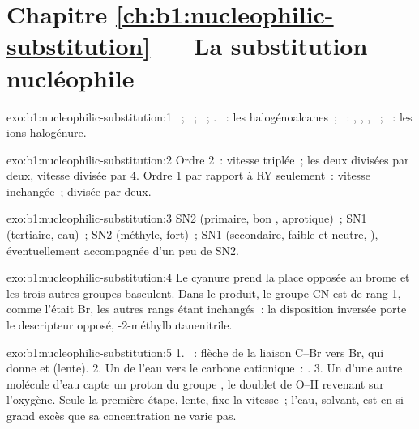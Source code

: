 \section*{Chapitre \ref{ch:b1:nucleophilic-substitution} --- La substitution nucléophile}

\begin{solution}{exo:b1:nucleophilic-substitution:1}
~; ~; ~;
. ~: les halogénoalcanes~; ~:
, , , ~; ~: les ions
halogénure.
\end{solution}

\begin{solution}{exo:b1:nucleophilic-substitution:2}
Ordre 2~: vitesse triplée~; les deux divisées par deux, vitesse divisée
par 4. Ordre 1 par rapport à RY seulement~: vitesse inchangée~; divisée
par deux.
\end{solution}

\begin{solution}{exo:b1:nucleophilic-substitution:3}
SN2 (primaire, bon , aprotique)~; SN1 (tertiaire, eau)~; SN2
(méthyle,  fort)~;  SN1 (secondaire, 
faible et neutre, ), éventuellement accompagnée d'un peu
de SN2.
\end{solution}

\begin{solution}{exo:b1:nucleophilic-substitution:4}
Le cyanure prend la place opposée au brome et les trois autres groupes
basculent. Dans le produit, le groupe CN est de rang 1, comme l'était
Br, les autres rangs étant inchangés~: la disposition inversée porte le
descripteur opposé, -2-méthylbutanenitrile.
\end{solution}

\begin{solution}{exo:b1:nucleophilic-substitution:5}
1. ~: flèche de la liaison C--Br vers Br, qui donne
 et  (lente). 2. Un  de l'eau vers
le carbone cationique~: . 3. Un  d'une
autre molécule d'eau capte un proton du groupe , le doublet de
O--H revenant sur l'oxygène. Seule la première étape, lente, fixe la
vitesse~; l'eau, solvant, est en si grand excès que sa concentration ne
varie pas.
\end{solution}

